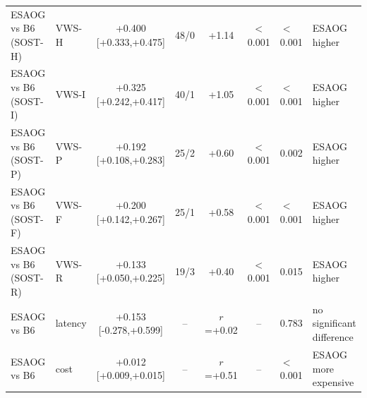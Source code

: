 \begin{table}[H]
{\begin{tabular}{llccccll}
ESAOG vs B6 (SOST-H) & VWS-H & +0.400 [+0.333,+0.475] & 48/0 & +1.14 & $<$0.001 & $<$0.001 & ESAOG higher\\
ESAOG vs B6 (SOST-I) & VWS-I & +0.325 [+0.242,+0.417] & 40/1 & +1.05 & $<$0.001 & $<$0.001 & ESAOG higher\\
ESAOG vs B6 (SOST-P) & VWS-P & +0.192 [+0.108,+0.283] & 25/2 & +0.60 & $<$0.001 & 0.002 & ESAOG higher\\
ESAOG vs B6 (SOST-F) & VWS-F & +0.200 [+0.142,+0.267] & 25/1 & +0.58 & $<$0.001 & $<$0.001 & ESAOG higher\\
ESAOG vs B6 (SOST-R) & VWS-R & +0.133 [+0.050,+0.225] & 19/3 & +0.40 & $<$0.001 & 0.015 & ESAOG higher\\
\midrule
ESAOG vs B6 & latency & +0.153 [-0.278,+0.599] & -- & $r$=+0.02 & -- & 0.783 & no significant difference\\
ESAOG vs B6 & cost & +0.012 [+0.009,+0.015] & -- & $r$=+0.51 & -- & $<$0.001 & ESAOG more expensive\\
\bottomrule
\end{tabular}}
\end{table}
